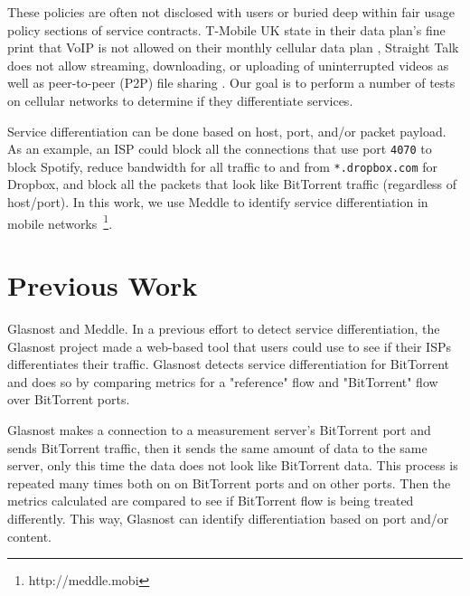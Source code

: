 \documentclass[letterpaper]{sig-alternate-10pt}
\begin{document}
These policies are often not disclosed with users or buried deep within fair usage policy sections of service contracts. T-Mobile UK state in their data plan's fine print that VoIP is not allowed on their monthly cellular data plan \cite{tmobuk}, Straight Talk does not allow streaming, downloading, or uploading of uninterrupted videos as well as peer-to-peer (P2P) file sharing \cite{straighttalk}. Our goal is to perform a number of tests on cellular networks to determine if they differentiate services.

Service differentiation can be done based on host, port, and/or packet payload. As an example, an ISP could block all the connections that use port \texttt{4070} to block Spotify, reduce bandwidth for all traffic to and from \texttt{*.dropbox.com} for Dropbox, and block all the packets that look like BitTorrent traffic (regardless of host/port). In this work, we use Meddle to identify service differentiation in mobile networks~\footnote{http://meddle.mobi}.

%
\section{Previous Work}
\label{sec:prevwork}

Glasnost and Meddle.
In a previous effort to detect service differentiation, the Glasnost project made a web-based tool that users could use to see if their ISPs differentiates their traffic. Glasnost detects service differentiation for BitTorrent and does so by comparing metrics for a "reference" flow and "BitTorrent" flow over BitTorrent ports.

Glasnost makes a connection to a measurement server's BitTorrent port and sends BitTorrent traffic, then it sends the same amount of data to the same server, only this time the data does not look like BitTorrent data. This process is repeated many times both on on BitTorrent ports and on other ports. Then the metrics calculated are compared to see if BitTorrent flow is being treated differently. This way, Glasnost can identify differentiation based on port and/or content.
\end{document}
